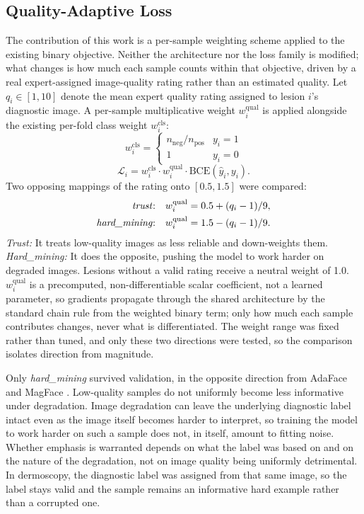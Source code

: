 \documentclass[conference]{IEEEtran}
\begin{document}
\subsection{Quality-Adaptive Loss}
\label{sec:qaloss}
The contribution of this work is a per-sample weighting scheme applied to the existing binary
objective. Neither the architecture nor the loss family is modified; what changes is how much
each sample counts within that objective, driven by a real expert-assigned image-quality
rating rather than an estimated quality. Let $q_i \in [1,10]$ denote the mean expert quality
rating assigned to lesion $i$'s diagnostic image. A per-sample multiplicative weight
$w_i^{\mathrm{qual}}$ is applied alongside the existing per-fold class weight
$w_i^{\mathrm{cls}}$:
\begin{equation}
w_i^{\mathrm{cls}} =
\begin{cases}
n_{\mathrm{neg}}/n_{\mathrm{pos}} & y_i = 1 \\
1 & y_i = 0
\end{cases}
\end{equation}
\begin{equation}
\mathcal{L}_i = w_i^{\mathrm{cls}} \cdot w_i^{\mathrm{qual}} \cdot \mathrm{BCE}(\hat{y}_i, y_i).
\end{equation}
Two opposing mappings of the rating onto $[0.5,1.5]$ were compared:
\begin{align}
\text{\emph{trust}:}\quad & w_i^{\mathrm{qual}} = 0.5 + (q_i - 1)/9, \\
\text{\emph{hard\_mining}:}\quad & w_i^{\mathrm{qual}} = 1.5 - (q_i - 1)/9.
\end{align}
\emph{Trust:} It treats low-quality images as less reliable and down-weights them.
\emph{Hard\_mining:} It does the opposite, pushing the model to work harder on degraded images.
Lesions without a valid rating receive a neutral weight of 1.0. $w_i^{\mathrm{qual}}$ is a
precomputed, non-differentiable scalar coefficient, not a learned parameter, so gradients
propagate through the shared architecture by the standard chain rule from the weighted binary
term; only how much each sample contributes changes, never what is differentiated. The weight
range was fixed rather than tuned, and only these two directions were tested, so the
comparison isolates direction from magnitude.

Only \emph{hard\_mining} survived validation, in the opposite direction from AdaFace and MagFace \cite{adaface,magface}. Low-quality samples do not uniformly become less informative under degradation. Image degradation can leave the underlying diagnostic label intact even as the image itself becomes harder to interpret, so training the model to work harder on such a sample does not, in itself, amount to fitting noise. Whether emphasis is warranted depends on what the label was based on and on the nature of the degradation, not on image quality being uniformly detrimental. In dermoscopy, the diagnostic label was assigned from that same image, so the label stays valid and the sample remains an informative hard example rather than a corrupted one.
\end{document}

